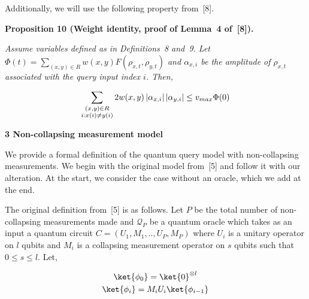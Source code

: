 Additionally, we will use the following property from [8].\par





\par\medskip\noindent\textbf{
\textbf{Proposition 10}\textbf{ }(Weight identity, proof of Lemma 4 of [8])\textbf{.}
}\par



\emph{Assume variables defined as in Definitions 8 and 9. Let $\Phi(t)=\sum_{(x,y)\in R}w(x,y)F(\rho_{x,t},\rho_{y,t})$ and $\alpha_{x,i}$ be the amplitude of $\rho_{x,t}$ associated with the query input index $i$. Then,}\par


\[\begin{gathered}
\displaystyle\sum_{\begin{subarray}{c}(x,y)\in R\\
i:x(i)\neq y(i)\end{subarray}}2w(x,y)\left|\alpha_{x,i}\right|\left|\alpha_{y,i}\right|\leq v_{max}\Phi(0)
\end{gathered}\]








\par\medskip\noindent\textbf{
3 Non-collapsing measurement model}\par




We provide a formal definition of the quantum query model with non-collapsing measurements. We begin with the original model from [5] and follow it with our alteration. At the start, we consider the case without an oracle, which we add at the end.\par




The original definition from [5] is as follows. Let $P$ be the total number of non-collapsing measurements made and $\mathcal{Q}_{P}$ be a quantum oracle which takes as an input a quantum circuit $C=(U_{1},M_{1},..,U_{P},M_{P})$ where $U_{i}$ is a unitary operator on $l$ qubits and $M_{i}$ is a collapsing measurement operator on $s$ qubits such that $0\leq s\leq l$. Let,\par


\[\begin{gathered}
\displaystyle\ket{\phi_{0}} \displaystyle=\ket{0}^{\otimes l} \\
\displaystyle\ket{\phi_{i}} \displaystyle=M_{i}U_{i}\ket{\phi_{i-1}}
\end{gathered}\]


